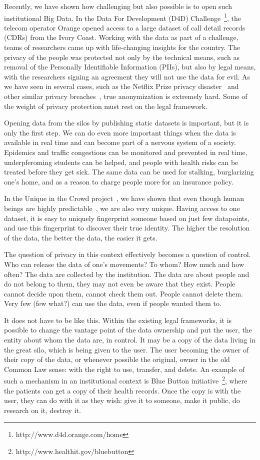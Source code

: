 Recently, we have shown how challenging but also possible is to open such institutional Big Data.
In the Data For Development (D4D) Challenge~\footnote{http://www.d4d.orange.com/home}, the telecom operator Orange opened access to a large dataset of call detail records (CDRs) from the Ivory Coast.
Working with the data as part of a challenge, teams of researchers came up with life-changing insights for the country. 
The privacy of the people was protected not only by the technical means, such as removal of the Personally Identifiable Information (PIIs), but also by legal means, with the researchers signing an agreement they will not use the data for evil.
As we have seen in several cases, such as the Netflix Prize privacy disaster~\cite{narayanan2008robust} and other similar privacy breaches~\cite{sweeney2000simple}, true anonymization is extremely hard.  Some of the weight of privacy protection must rest on the legal framework.

Opening data from the silos by publishing static datasets is important, but it is only the first step. 
We can do even more important things when the data is available in real time and can become part of a nervous system of a society.
Epidemics and traffic congestions can be monitored and prevented in real time, underpferoming students can be helped, and people with health risks can be treated before they get sick.
The same data can be used for stalking, burglarizing one's home, and as a reason to charge people more for an insurance policy.

In the Unique in the Crowd project~\cite{de2013unique}, we have shown that even though human beings are highly predictable~\cite{song2010limits}, we are also very unique.
Having access to one dataset, it is easy to uniquely fingerprint someone based on just few datapoints, and use this fingerprint to discover their true identity. 
The higher the resolution of the data, the better the data, the easier it gets.

The question of privacy in this context effectively becomes a question of control. 
Who can release the data of one's movements?
To whom? 
How much and how often?
The data are collected by the institution.
The data are about people and do not belong to them, they may not even be aware that they exist.
People cannot decide upon them, cannot check them out.
People cannot delete them.
Very few (few what?) can use the data, even if people wanted them to.

It does not have to be like this.
Within the existing legal frameworks, it is possible to change the vantage point of the data ownership and put the user, the entity about whom the data are, in control.
It may be a copy of the data living in the great silo, which is being given to the user.
The user becoming the owner of their copy of the data, or whenever possible the original, owner in the old Common Law sense: with the right to use, transfer, and delete. 
An example of such a mechanism in an institutional context is Blue Button initiative~\footnote{http://www.healthit.gov/bluebutton}, where the patients can get a copy of their health records.
Once the copy is with the user, they can do with it as they wish: give it to someone, make it public, do research on it, destroy it.

